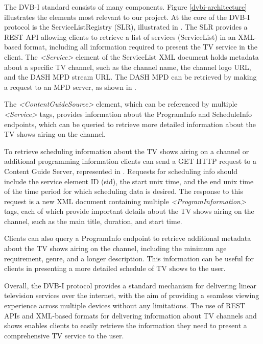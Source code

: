 \documentclass[conference]{IEEEtran}
\begin{document}
The DVB-I standard consists of many components. Figure \ref{dvbi-architecture} illustrates the elements most relevant to our project. At the core of the DVB-I protocol is the ServiceListRegistry (SLR), illustrated in . The SLR provides a REST API allowing clients to retrieve a list of services (ServiceList) in an XML-based format, including all information required to present the TV service in the client. The \textit{<Service>} element of the ServiceList XML document holds metadata about a specific TV channel, such as the channel name, the channel logo URL, and the DASH MPD stream URL. The DASH MPD can be retrieved by making a request to an MPD server, as shown in  .

The \textit{<ContentGuideSource>} element, which can be referenced by multiple \textit{<Service>} tags, provides information about the ProgramInfo and ScheduleInfo endpoints, which can be queried to retrieve more detailed information about the TV shows airing on the channel.

To retrieve scheduling information about the TV shows airing on a channel or additional programming information clients can send a GET HTTP request to a Content Guide Server, represented in . Requests for scheduling info should include the service element ID (sid), the start unix time, and the end unix time of the time period for which scheduling data is desired. The response to this request is a new XML document containing multiple \textit{<ProgramInformation>} tags, each of which provide important details about the TV shows airing on the channel, such as the main title, duration, and start time.

Clients can also query a ProgramInfo endpoint to retrieve additional metadata about the TV shows airing on the channel, including the minimum age requirement, genre, and a longer description. This information can be useful for clients in presenting a more detailed schedule of TV shows to the user.

Overall, the DVB-I protocol provides a standard mechanism for delivering linear television services over the internet, with the aim of providing a seamless viewing experience across multiple devices without any limitations. The use of REST APIs and XML-based formats for delivering information about TV channels and shows enables clients to easily retrieve the information they need to present a comprehensive TV service to the user.
\end{document}

